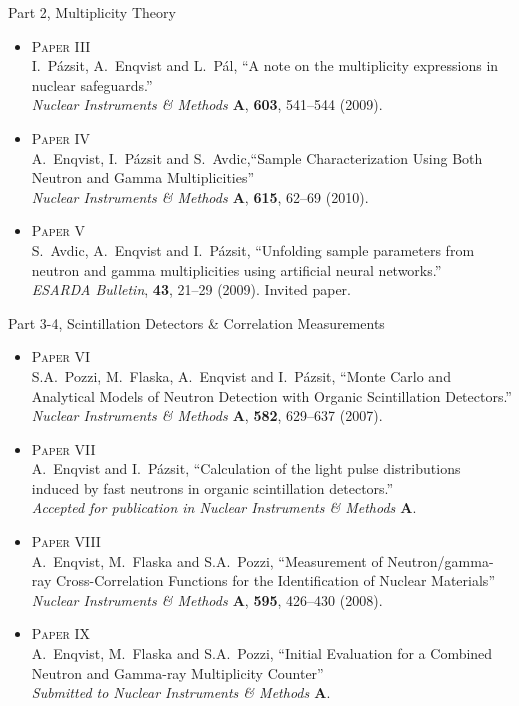 \documentclass[clock,style=horatio,paper=screen,blackslide,trans=Wipe,mode=present]{powerdot}
\begin{document}
\begin{slide}{Part 2, Multiplicity Theory}
\begin{itemize}
\item \textsc{Paper III}\\[1mm] I.~P\'{a}zsit, A.~Enqvist and L.~P\'{a}l, ``A note on the multiplicity expressions in nuclear safeguards.''\\
\emph{Nuclear Instruments \& Methods $\boldsymbol{A}$},
\textbf{603}, 541--544 (2009).

\item \textsc{Paper IV}\\[1mm] A.~Enqvist, I.~P\'{a}zsit and S.~Avdic,``Sample Characterization Using Both Neutron and Gamma Multiplicities''\\
\emph{Nuclear Instruments \& Methods $\boldsymbol{A}$},
\textbf{615}, 62--69 (2010).

\item \textsc{Paper V}\\[1mm] S.~Avdic, A.~Enqvist and I.~P\'{a}zsit, ``Unfolding sample parameters from neutron and gamma multiplicities using artificial neural networks.''\\
\emph{ESARDA Bulletin}, \textbf{43}, 21--29 (2009). Invited
paper.
\end{itemize}
\end{slide}


\begin{wideslide}{Part 3-4, Scintillation Detectors \& Correlation Measurements}
\small \begin{itemize}
\item \textsc{Paper VI}\\[1mm] S.A.~Pozzi, M.~Flaska, A.~Enqvist and I.~P\'{a}zsit, ``Monte Carlo and Analytical Models of Neutron Detection with Organic Scintillation Detectors.''\\
\emph{Nuclear Instruments \& Methods $\boldsymbol{A}$},
\textbf{582}, 629--637 (2007).

\item \textsc{Paper VII}\\[1mm] A.~Enqvist and I.~P\'{a}zsit, ``Calculation of the light pulse distributions induced by fast neutrons in organic scintillation detectors.''\\
\emph{Accepted for publication in Nuclear Instruments \& Methods
$\boldsymbol{A}$}.

\item \textsc{Paper VIII}\\[1mm] A.~Enqvist, M.~Flaska and S.A.~Pozzi, ``Measurement of Neutron/gamma-ray Cross-Correlation Functions for the Identification of Nuclear Materials''\\
\emph{Nuclear Instruments \& Methods $\boldsymbol{A}$},
\textbf{595}, 426--430 (2008).

\item \textsc{Paper IX}\\[1mm] A.~Enqvist, M.~Flaska and S.A.~Pozzi, ``Initial Evaluation for a Combined Neutron and Gamma-ray Multiplicity Counter''\\
\emph{Submitted to Nuclear Instruments \& Methods
$\boldsymbol{A}$}.
\end{itemize}
\end{wideslide}
\end{document}
